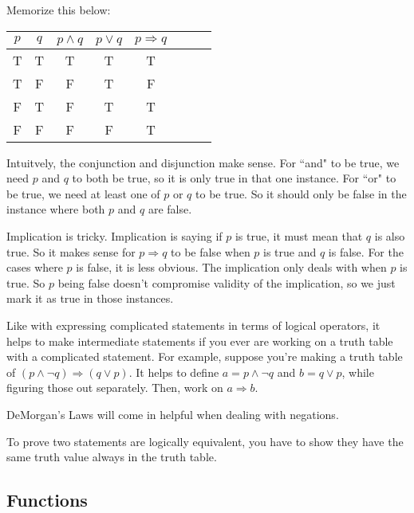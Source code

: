 \documentclass[11pt]{scrartcl}
\begin{document}
Memorize this below:
\begin{center}
\begin{tabular}{|c|c||c|c|c|c|c|c|}
        \hline
        $p$ & $q$ & $p \wedge q$ & $p \vee q$ & $p \Rightarrow q$ \\ \hline
        T & T & T & T & T \\ \hline
        T & F & F & T & F \\ \hline
        F & T & F & T & T \\ \hline
        F & F & F & F & T  \\ \hline
        \end{tabular}
\end{center}
Intuitvely, the conjunction and disjunction make sense. For ``and" to be true, we need $p$ and $q$ to both be true, so it is only true in that one instance. For ``or" to be true, we need at least one of $p$ or $q$ to be true. So it should only be false in the instance where both $p$ and $q$ are false.

Implication is tricky. Implication is saying if $p$ is true, it must mean that $q$ is also true. So it makes sense for $p \Rightarrow q$ to be false when $p$ is true and $q$ is false. For the cases where $p$ is false, it is less obvious. The implication only deals with when $p$ is true. So $p$ being false doesn't compromise validity of the implication, so we just mark it as true in those instances.

\begin{advice}
    Like with expressing complicated statements in terms of logical operators, it helps to make intermediate statements if you ever are working on a truth table with a complicated statement. For example, suppose you're making a truth table of $(p \wedge \neg q) \Rightarrow (q \vee p)$. It helps to define $a = p \wedge \neg q$ and $b = q \vee p$, while figuring those out separately. Then, work on $a \Rightarrow b$.
\end{advice}

\begin{advice}
    DeMorgan's Laws will come in helpful when dealing with negations.
\end{advice}

To prove two statements are logically equivalent, you have to show they have the same truth value always in the truth table.

\subsection{Functions}
\end{document}
